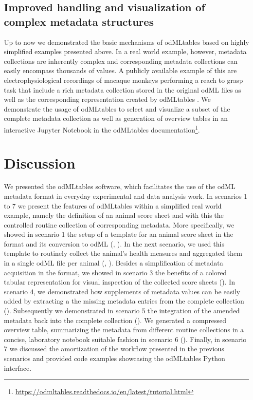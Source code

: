 \subsection*{Improved handling and visualization of complex metadata structures}
Up to now we demonstrated the basic mechanisms of odMLtables based on highly simplified examples presented above. In a real world example, however, metadata collections are inherently complex and corresponding metadata collections can easily encompass thousands of values. A publicly available example of this are electrophysiological recordings of macaque monkeys performing a reach to grasp task that include a rich metadata collection stored in the original odML files as well as the corresponding  representation created by odMLtables \citep{Brochier_2018}. We demonstrate the usage of odMLtables to select and visualize a subset of the complete metadata collection as well as generation of overview tables in an interactive Jupyter Notebook in the odMLtables documentation\footnote{\url{https://odmltables.readthedocs.io/en/latest/tutorial.html}}.

\section{Discussion}
\label{sec:Discussion}

We presented the odMLtables software, which facilitates the use of the odML metadata format in everyday experimental and data analysis work. In scenarios 1 to 7 we present the features of odMLtables within a simplified real world example, namely the definition of an animal score sheet and with this the controlled routine collection of corresponding metadata. More specifically, we showed in scenario 1 the setup of a template for an animal score sheet in the  format and its conversion to odML (\fconvert, \fgenerate). In the next scenario, we used this template to routinely collect the animal's health measures and aggregated them in a single odML file per animal (\fconvert, \fmerge). Besides a simplification of metadata acquisition in the  format,  we showed in scenario 3 the benefits of a colored tabular representation for visual inspection of the collected score sheets (\fconvert). In scenario 4, we demonstrated how supplements of metadata values can be easily added by extracting a the missing metadata entries from the complete collection (\ffilter). Subsequently we demonstrated in scenario 5 the integration of the amended metadata back into the complete collection (\fmerge). We generated a compressed overview table, summarizing the metadata from different routine collections in a concise, laboratory notebook suitable fashion in scenario 6 (\fcompare). Finally, in scenario 7 we discussed the amortization of the workflow presented in the previous scenarios and provided code examples showcasing the odMLtables Python interface.

